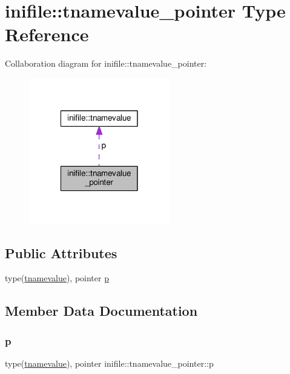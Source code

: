 \hypertarget{structinifile_1_1tnamevalue__pointer}{}\section{inifile\+:\+:tnamevalue\+\_\+pointer Type Reference}
\label{structinifile_1_1tnamevalue__pointer}


Collaboration diagram for inifile\+:\+:tnamevalue\+\_\+pointer\+:
\nopagebreak
\begin{figure}[H]
\begin{center}
\leavevmode
\includegraphics[width=174pt]{structinifile_1_1tnamevalue__pointer__coll__graph}
\end{center}
\end{figure}
\subsection*{Public Attributes}
\begin{DoxyCompactItemize}
\item 
type(\mbox{\hyperlink{structinifile_1_1tnamevalue}{tnamevalue}}), pointer \mbox{\hyperlink{structinifile_1_1tnamevalue__pointer_a8f5c41370084de1ee1c021feceb8bb85}{p}}
\end{DoxyCompactItemize}


\subsection{Member Data Documentation}
\mbox{\label{structinifile_1_1tnamevalue__pointer_a8f5c41370084de1ee1c021feceb8bb85}} 
\subsubsection{\texorpdfstring{p}{p}}
{\footnotesize\ttfamily type(\mbox{\hyperlink{structinifile_1_1tnamevalue}{tnamevalue}}), pointer inifile\+::tnamevalue\+\_\+pointer\+::p}



